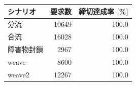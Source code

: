 \begin{tabular}{lrr}
\hline \hline
シナリオ & 要求数 & 締切達成率 [\%] \\
\hline
分流 & 10649 & 100.0 \\
合流 & 16028 & 100.0 \\
障害物封鎖 & 2967 & 100.0 \\
weave & 8600 & 100.0 \\
weave2 & 12267 & 100.0 \\
\hline
\end{tabular}
